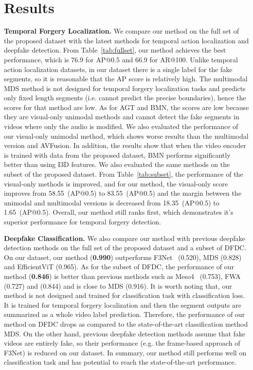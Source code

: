 \documentclass[conference, a4paper]{IEEEtran}
\makeatletter
\newcommand*{\eg}{e.g.\@\xspace}
\newcommand*{\ie}{i.e.\@\xspace}
\makeatother
\begin{document}
\section{Results}
\label{sec:results}
\noindent \textbf{Temporal Forgery Localization.} We compare our method on the full set of the proposed dataset with the latest methods for temporal action localization and deepfake detection. From Table~\ref{tab:fullset}, our method achieves the best performance, which is 76.9 for AP@0.5 and 66.9 for AR@100. Unlike temporal action localization datasets, in our dataset there is a single label for the fake segments, so it is reasonable that the AP score is relatively high. The multimodal MDS method is not designed for temporal forgery localization tasks and predicts only fixed length segments (\ie cannot predict the precise boundaries), hence the scores for that method are low. As for AGT and BMN, the scores are low because they are visual-only unimodal methods and cannot detect the fake segments in videos where only the audio is modified. We also evaluated the performance of our visual-only unimodal method, which shows worse results than the multimodal version and AVFusion. In addition, the results show that when the video encoder is trained with data from the proposed dataset, BMN performs significantly better than using I3D features. We also evaluated the same methods on the subset of the proposed dataset. From Table~\ref{tab:subset}, the performance of the visual-only methods is improved, and for our method, the visual-only score improves from 58.55~(AP@0.5) to 83.55~(AP@0.5) and the margin between the unimodal and multimodal versions is decreased from 18.35~(AP@0.5) to 1.65~(AP@0.5). Overall, our method still ranks first, which demonstrates it's superior performance for temporal forgery detection.

\noindent \textbf{Deepfake Classification.} We also compare our method with previous deepfake detection methods on the full set of the proposed dataset and a subset of DFDC. On our dataset, our method (\textbf{0.990}) outperforms F3Net~\cite{qian_thinking_2020} (0.520), MDS (0.828) and EfficientViT (0.965). As for the subset of DFDC, the performance of our method (\textbf{0.846}) is better than previous methods such as Meso4~\cite{afchar_mesonet_2018} (0.753), FWA~\cite{li_exposing_2019} (0.727) and \cite{mittal_emotions_2020} (0.844) and is close to MDS (0.916). It is worth noting that, our method is not designed and trained for classification task with classification loss. It is trained for temporal forgery localization and then the segment outputs are summarized as a whole video label prediction. Therefore, the performance of our method on DFDC drops as compared to the state-of-the-art classification method MDS. On the other hand, previous deepfake detection methods assume that fake videos are entirely fake, so their performance (\eg the frame-based approach of F3Net) is reduced on our dataset. In summary, our method still performs well on classification task and has potential to reach the state-of-the-art performance.
\end{document}

